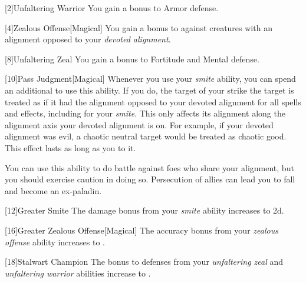         [2]{Unfaltering Warrior}
        You gain a  bonus to Armor defense.

        [4]{Zealous Offense}[Magical]
        You gain a  bonus to  against creatures with an alignment opposed to your \textit{devoted alignment}.

        [8]{Unfaltering Zeal}
        You gain a  bonus to Fortitude and Mental defense.

        [10]{Pass Judgment}[Magical] Whenever you use your \textit{smite} ability, you can spend an additional  to use this ability.
        If you do, the target of your strike the target is treated as if it had the alignment opposed to your devoted alignment for all spells and effects, including for your \textit{smite}.
        This only affects its alignment along the alignment axis your devoted alignment is on.
        For example, if your devoted alignment was evil, a chaotic neutral target would be treated as chaotic good.
        This effect lasts as long as you  to it.

        You can use this ability to do battle against foes who share your alignment, but you should exercise caution in doing so.
        Persecution of allies can lead you to fall and become an ex-paladin.

        [12]{Greater Smite} The damage bonus from your \textit{smite} ability increases to \plus2d.

        [16]{Greater Zealous Offense}[Magical]
        The accuracy bonus from your \textit{zealous offense} ability increases to .

        [18]{Stalwart Champion}
        The bonus to defenses from your \textit{unfaltering zeal} and \textit{unfaltering warrior} abilities increase to .


